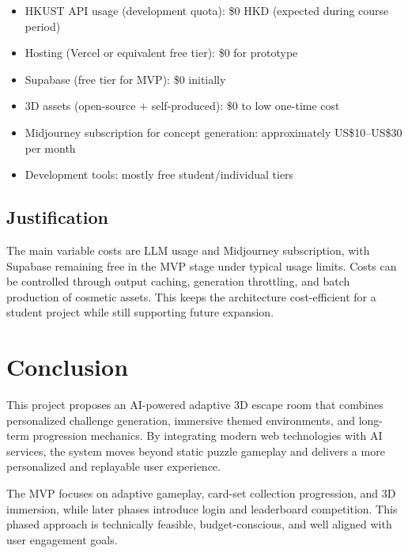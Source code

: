 \documentclass[12pt]{article}
\begin{document}
\begin{itemize}
    \item HKUST API usage (development quota): \$0 HKD (expected during course period)
    \item Hosting (Vercel or equivalent free tier): \$0 for prototype
    \item Supabase (free tier for MVP): \$0 initially
    \item 3D assets (open-source + self-produced): \$0 to low one-time cost
    \item Midjourney subscription for concept generation: approximately US\$10--US\$30 per month
    \item Development tools: mostly free student/individual tiers
\end{itemize}

\subsection{Justification}

The main variable costs are LLM usage and Midjourney subscription, with Supabase remaining free in the MVP stage under typical usage limits. Costs can be controlled through output caching, generation throttling, and batch production of cosmetic assets. This keeps the architecture cost-efficient for a student project while still supporting future expansion.

\section{Conclusion}

This project proposes an AI-powered adaptive 3D escape room that combines personalized challenge generation, immersive themed environments, and long-term progression mechanics. By integrating modern web technologies with AI services, the system moves beyond static puzzle gameplay and delivers a more personalized and replayable user experience.

The MVP focuses on adaptive gameplay, card-set collection progression, and 3D immersion, while later phases introduce login and leaderboard competition. This phased approach is technically feasible, budget-conscious, and well aligned with user engagement goals.
\end{document}
